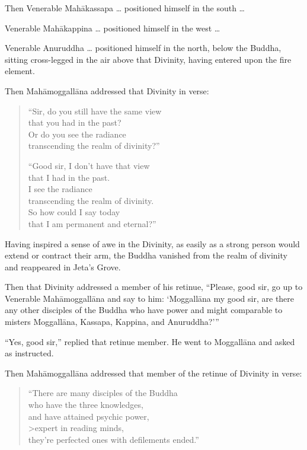 \documentclass[12pt,openany]{book}%
\begin{document}
Then Venerable \textsanskrit{Mahākassapa} … positioned himself in the south … 

Venerable \textsanskrit{Mahākappina} … positioned himself in the west … 

Venerable Anuruddha … positioned himself in the north, below the Buddha, sitting cross-legged in the air above that Divinity, having entered upon the fire element. 

Then \textsanskrit{Mahāmoggallāna} addressed that Divinity in verse: 

\begin{verse}%
“Sir, do you still have the same view \\
that you had in the past? \\
Or do you see the radiance \\
transcending the realm of divinity?” 

“Good sir, I don’t have that view \\
that I had in the past. \\
I see the radiance \\
transcending the realm of divinity. \\
So how could I say today \\
that I am permanent and eternal?” 

%
\end{verse}

Having inspired a sense of awe in the Divinity, as easily as a strong person would extend or contract their arm, the Buddha vanished from the realm of divinity and reappeared in Jeta’s Grove. 

Then that Divinity addressed a member of his retinue, “Please, good sir, go up to Venerable \textsanskrit{Mahāmoggallāna} and say to him: ‘\textsanskrit{Moggallāna} my good sir, are there any other disciples of the Buddha who have power and might comparable to misters \textsanskrit{Moggallāna}, Kassapa, Kappina, and Anuruddha?’” 

“Yes, good sir,” replied that retinue member. He went to \textsanskrit{Moggallāna} and asked as instructed. 

Then \textsanskrit{Mahāmoggallāna} addressed that member of the retinue of Divinity in verse: 

\begin{verse}%
“There are many disciples of the Buddha \\
who have the three knowledges, \\
and have attained psychic power, \\>expert in reading minds, \\
they’re perfected ones with defilements ended.” 

%
\end{verse}
\end{document}
